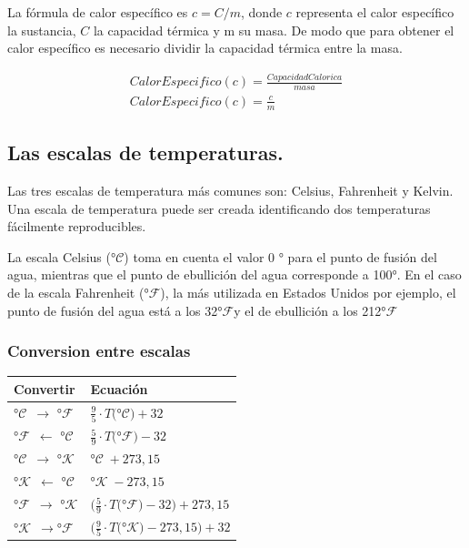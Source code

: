\documentclass[twocolumn, 12pt]{article}
\newcommand{\Celsius}[0]{°$\mathcal{C}$}
\newcommand{\Kelvin}[0]{°$\mathcal{K}$}
\newcommand{\Fahrenheit}[0]{°$\mathcal{F}$}
\begin{document}
La fórmula de calor específico es $c = C / m$, donde $c$
representa el calor específico la sustancia, $C$ la
capacidad térmica y m su masa. De modo que para obtener el
calor específico es necesario dividir la capacidad térmica
entre la masa.

    {\small
        \begin{equation*}
            \begin{gathered}
                CalorEspecifico (c) = \frac{CapacidadCalorica}{masa} \\
                CalorEspecifico (c) = \frac{c}{m}
            \end{gathered}
        \end{equation*}

    }

\subsection{Las escalas de temperaturas.~\cite{Escalasdetemperatura}}

Las tres escalas de temperatura más comunes son: Celsius,
Fahrenheit y Kelvin. Una escala de temperatura puede ser
creada identificando dos temperaturas fácilmente
reproducibles.

La escala Celsius (\Celsius) toma en cuenta el valor 0 °
para el punto de fusión del agua, mientras que el punto de
ebullición del agua corresponde a 100°. En el caso de la
escala Fahrenheit (\Fahrenheit), la más utilizada en
Estados Unidos por ejemplo, el punto de fusión del agua
está a los 32\Fahrenheit y el de ebullición a los
212\Fahrenheit

\subsubsection{Conversion entre escalas}

\begin{table}[H]
    \begin{tabularx}{.9\linewidth}{|>{\centering\arraybackslash}X|>{\centering\arraybackslash}X|}
        \hline
        Convertir                          & Ecuación                                             \\\hline
        \Celsius~$\rightarrow$ \Fahrenheit & $\frac{9}{5} \cdot T($\Celsius$) + 32$               \\\hline
        \Fahrenheit~$\leftarrow$ \Celsius  & $\frac{5}{9} \cdot T($\Fahrenheit$) - 32$            \\\hline
        \Celsius~$\rightarrow$ \Kelvin     & \Celsius~$+~273,15$                                  \\\hline
        \Kelvin~$\leftarrow$ \Celsius      & \Kelvin~$-~273,15$                                   \\\hline
        \Fahrenheit~$\rightarrow$ \Kelvin  & $(\frac{5}{9} \cdot T($\Fahrenheit$) - 32) + 273,15$ \\\hline
        \Kelvin~$\rightarrow$\Fahrenheit   & $(\frac{9}{5} \cdot T($\Kelvin$) - 273,15) + 32$     \\\hline
    \end{tabularx}
\end{table}
\end{document}
